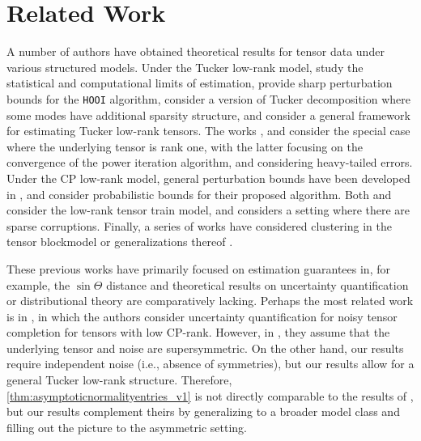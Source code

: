 \documentclass[10pt]{article}
\newcommand{\0}{{\mathbf{0}}}
\newcommand{\1}{{\mathbf{1}}}
\renewcommand{\citet}{\cite}
\begin{document}
\section{Related Work}
\label{sec:relatedwork}
A number of authors have obtained theoretical results for tensor data under various structured models. Under  the Tucker low-rank model, \citet{zhang_tensor_2018} study the statistical and computational limits of estimation,  \citet{luo_sharp_2021} provide sharp  perturbation bounds for the \texttt{HOOI} algorithm,  \citet{zhang_optimal_2019} consider a version of Tucker decomposition where some modes have additional sparsity structure, and \citet{han_optimal_2022} consider a general framework for estimating Tucker low-rank tensors.  The works \citet{richard2014statistical,auddy_estimating_2022}, and \citet{huang_power_2022} consider the special case where the underlying tensor is rank one, with the latter focusing on the convergence of the power iteration algorithm, and \citet{auddy_estimating_2022} considering heavy-tailed errors.  Under the CP low-rank model, general perturbation bounds have been developed in \citet{auddy_perturbation_2023}, and \citet{han_tensor_2023} consider probabilistic bounds for their proposed algorithm.  Both \citet{zhou_optimal_2022} and \citet{cai_provable_2022} consider the low-rank tensor train model, and \citet{hao_sparse_2020} considers a setting where there are sparse corruptions.  Finally, a series of works  have considered clustering in the tensor blockmodel \citep{han_exact_2020,luo_tensor_2022,wu_general_2016,chi_provable_2020,wang_multiway_2019} or generalizations thereof \citep{agterberg_estimating_2022,hu_multiway_2022,lyu_optimal_2022,lyu_optimal_2022-1,jing_community_2021,hu_multiway_2022}.


These previous works have primarily focused on estimation guarantees in, for example, the $\sin\Theta$ distance and theoretical results on uncertainty quantification or distributional theory are comparatively lacking.
Perhaps the most related work is in \citet{cai_uncertainty_2022}, in which the authors consider uncertainty quantification for noisy tensor completion for tensors with low CP-rank.  However, in \citet{cai_uncertainty_2022}, they assume that the underlying tensor and noise are supersymmetric.  On the other hand, our results require independent noise (i.e., absence of symmetries), but our results allow for a general Tucker low-rank structure.   Therefore,  \cref{thm:asymptoticnormalityentries_v1} is not directly comparable to the results of \citet{cai_uncertainty_2022}, but our results complement theirs by generalizing to a broader model class and filling out the picture to the asymmetric setting.  
\end{document}
